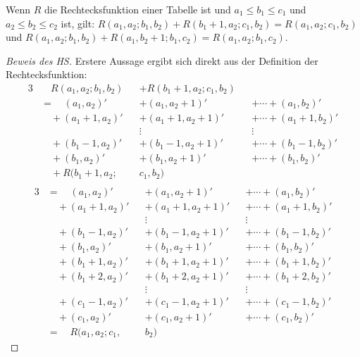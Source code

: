 \begin{lem}\label{r_summe}
    Wenn $R$ die Rechtecksfunktion einer Tabelle ist und $a_1\leq b_1\leq c_1$ und $a_2\leq b_2\leq c_2$ ist, gilt: 
    $R(a_1, a_2; b_1, b_2)+R(b_1+1, a_2; c_1, b_2)=R(a_1, a_2; c_1, b_2)$ und 
    $R(a_1, a_2; b_1, b_2)+R(a_1, b_2+1; b_1, c_2)=R(a_1, a_2; b_1, c_2)$.
\end{lem}
\begin{proof}[Beweis des HS]
    Erstere Aussage ergibt sich direkt aus der Definition der Rechtecksfunktion:
    \begin{alignat*}{3}
        &\quad R(a_1, a_2; b_1, b_2)&& +R(b_1+1, a_2; c_1, b_2)&&\\
        &=\quad(a_1, a_2)' &&+ (a_1, a_2+1)' &&+\cdots+ (a_1, b_2)'\\
        &\quad+(a_1+1, a_2)' &&+ (a_1+1, a_2+1)' &&+\cdots+ (a_1+1, b_2)'\\
        &\quad &&\vdots\quad\quad\quad\quad&&\vdots\\
        &\quad+(b_1-1, a_2)' &&+ (b_1-1, a_2+1)' &&+\cdots + (b_1-1, b_2)'\\
        &\quad+(b_1, a_2)' &&+ (b_1, a_2+1)' &&+ \cdots + (b_1, b_2)'\\
        &\quad+R(b_1+1, a_2; &&c_1, b_2) &&\\
    \end{alignat*}
    \begin{alignat*}{3}
        &=\quad(a_1, a_2)' &&+ (a_1, a_2+1)' &&+\cdots+ (a_1, b_2)'\\
        &\quad+(a_1+1, a_2)' &&+ (a_1+1, a_2+1)' &&+\cdots+ (a_1+1, b_2)'\\
        &\quad &&\vdots\quad\quad\quad\quad&&\vdots\\
        &\quad+(b_1-1, a_2)' &&+ (b_1-1, a_2+1)' &&+\cdots + (b_1-1, b_2)'\\
        &\quad+(b_1, a_2)' &&+ (b_1, a_2+1)' &&+ \cdots + (b_1, b_2)'\\
        &\quad+(b_1+1, a_2)' &&+ (b_1+1, a_2+1)' &&+\cdots+ (b_1+1, b_2)'\\
        &\quad+(b_1+2, a_2)' &&+ (b_1+2, a_2+1)' &&+\cdots+ (b_1+2, b_2)'\\
        &\quad &&\vdots\quad\quad\quad\quad&&\vdots\\
        &\quad+(c_1-1, a_2)' &&+ (c_1-1, a_2+1)' &&+\cdots + (c_1-1, b_2)'\\
        &\quad+(c_1, a_2)' &&+ (c_1, a_2+1)' &&+ \cdots + (c_1, b_2)'\\
        &=\quad R(a_1, a_2; c_1, &&b_2)&&

\end{alignat*}
\end{proof}
